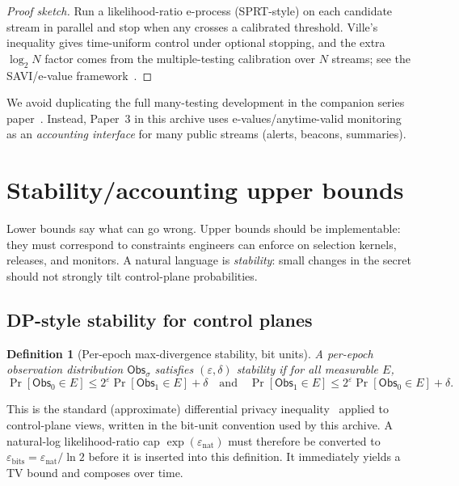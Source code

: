 \documentclass[11pt]{article}
\newtheorem{definition}{Definition}
\begin{document}
\begin{proof}[Proof sketch]
Run a likelihood-ratio e-process (SPRT-style) on each candidate stream in parallel and stop when any crosses a calibrated threshold.
Ville's inequality gives time-uniform control under optional stopping, and the extra $\log_2 N$ factor comes from the multiple-testing calibration over $N$ streams; see the SAVI/e-value framework~\cite{ramdas2024evalues,wang2025sebH}.
\end{proof}

We avoid duplicating the full many-testing development in the companion series paper~\cite{series:manytestinglowerbounds}.
Instead, Paper~3 in this archive uses e-values/anytime-valid monitoring as an \emph{accounting interface} for many public streams (alerts, beacons, summaries).


\section{Stability/accounting upper bounds}
\label{sec:upper}

Lower bounds say what can go wrong.
Upper bounds should be implementable: they must correspond to constraints engineers can enforce on selection kernels, releases, and monitors.
A natural language is \emph{stability}: small changes in the secret should not strongly tilt control-plane probabilities.

\subsection{DP-style stability for control planes}
\label{sec:dpstyle}

\begin{definition}[Per-epoch max-divergence stability, bit units]
A per-epoch observation distribution $\mathsf{Obs}_\sigma$ satisfies $(\varepsilon,\delta)$ stability if for all measurable $E$,
\[
\Pr[\mathsf{Obs}_0\in E] \le 2^{\varepsilon}\Pr[\mathsf{Obs}_1\in E]+\delta
\quad\text{and}\quad
\Pr[\mathsf{Obs}_1\in E] \le 2^{\varepsilon}\Pr[\mathsf{Obs}_0\in E]+\delta.
\]
\end{definition}

This is the standard (approximate) differential privacy inequality~\cite{dworkroth2014foundations} applied to control-plane views, written in the bit-unit convention used by this archive. A natural-log likelihood-ratio cap $\exp(\varepsilon_{\mathrm{nat}})$ must therefore be converted to $\varepsilon_{\mathrm{bits}}=\varepsilon_{\mathrm{nat}}/\ln 2$ before it is inserted into this definition.
It immediately yields a TV bound and composes over time.
\end{document}

